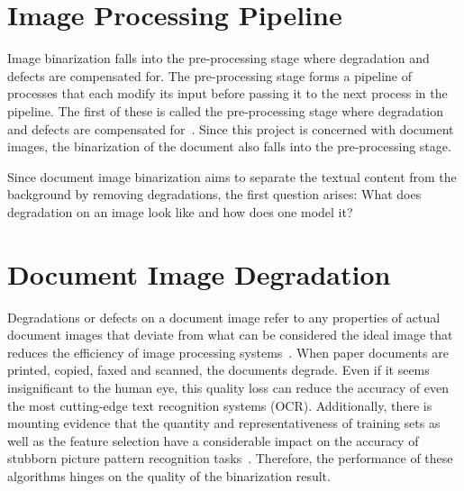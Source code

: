 \documentclass[a4paper, 12pt]{report}
\begin{document}
\section{Image Processing Pipeline}
Image binarization falls into the pre-processing stage where degradation and defects are compensated for. The pre-processing stage forms a pipeline of processes that each modify its input before passing it to the next process in the pipeline. The first of these is called the pre-processing stage where degradation and defects are compensated for~\cite{ramanath2005color}. Since this project is concerned with document images, the binarization of the document also falls into the pre-processing stage.\par

Since document image binarization aims to separate the textual content from the background by removing degradations, the first question arises: What does degradation on an image look like and how does one model it?

\section{Document Image Degradation}
Degradations or defects on a document image refer to any properties of actual document images that deviate from what can be considered the ideal image that reduces the efficiency of image processing systems~\cite{Baird2007}. When paper documents are printed, copied, faxed and scanned, the documents degrade. Even if it seems insignificant to the human eye, this quality loss can reduce the accuracy of even the most cutting-edge text recognition systems (OCR). Additionally, there is mounting evidence that the quantity and representativeness of training sets as well as the feature selection have a considerable impact on the accuracy of stubborn picture pattern recognition tasks~\cite{Baird2007}. Therefore, the performance of these algorithms hinges on the quality of the binarization result. \par
\end{document}
